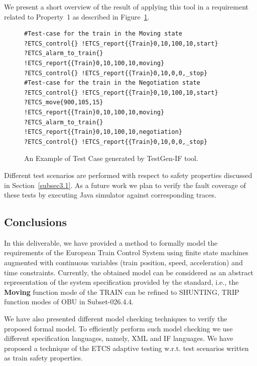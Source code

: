 \documentclass{template/openetcs_article}
\begin{document}
We present a short overview of the result of applying this tool in a requirement related to Property~1 as described in Figure~\ref{set:of:tests}.

\begin{figure}[!htbp]
\begin{lstlisting}
#Test-case for the train in the Moving state
?ETCS_control{} !ETCS_report{{Train}0,10,100,10,start}
?ETCS_alarm_to_train{} !ETCS_report{{Train}0,10,100,10,moving}
?ETCS_control{} !ETCS_report{{Train}0,10,0,0,_stop}
#Test-case for the train in the Negotiation state
?ETCS_control{} !ETCS_report{{Train}0,10,100,10,start}
?ETCS_move{900,105,15} !ETCS_report{{Train}0,10,100,10,moving}
?ETCS_alarm_to_train{} !ETCS_report{{Train}0,10,100,10,negotiation}
?ETCS_control{} !ETCS_report{{Train}0,10,0,0,_stop}
\end{lstlisting}
\caption{An Example of Test Case generated by TestGen-IF tool.\label{set:of:tests}}
\end{figure}

%

Different test scenarios are performed with respect to safety properties discussed in Section~\ref{subsec3.1}. As a future work we plan to verify the fault coverage of these tests by executing Java simulator against corresponding traces.


\subsection{Conclusions}

In this deliverable, we have provided a method to formally model the requirements of the European Train Control System using finite state machines augmented with continuous variables (train position, speed, acceleration) and time constraints. Currently, the obtained model can be considered as an abstract representation of the system specification provided by the standard, i.e., the {\bf Moving} function mode of the TRAIN can be refined to SHUNTING, TRIP function modes of OBU in Subset-026.4.4.

We have also presented different model checking techniques to verify the proposed formal model. To efficiently perform such model checking we use different specification languages, namely, XML and IF languages.
%
We have proposed a technique of the ETCS adaptive testing w.r.t. test scenarios written as train safety properties. 
\end{document}

